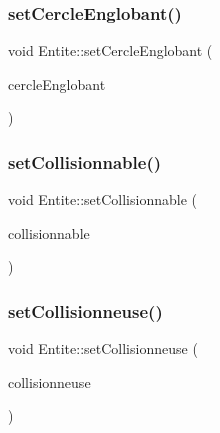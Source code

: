 \mbox{\label{class_entite_a88effd77e4276064031a02f5755cc321}} 
\subsubsection{\texorpdfstring{set\+Cercle\+Englobant()}{setCercleEnglobant()}}
{\footnotesize\ttfamily void Entite\+::set\+Cercle\+Englobant (\begin{DoxyParamCaption}\item[{const sf\+::\+Circle\+Shape \&}]{cercle\+Englobant }\end{DoxyParamCaption})\hspace{0.3cm}{\ttfamily [inline]}}

\mbox{\label{class_entite_acc07f9acea55b0a93b99f2ed57fef772}} 
\subsubsection{\texorpdfstring{set\+Collisionnable()}{setCollisionnable()}}
{\footnotesize\ttfamily void Entite\+::set\+Collisionnable (\begin{DoxyParamCaption}\item[{const bool \&}]{collisionnable }\end{DoxyParamCaption})\hspace{0.3cm}{\ttfamily [inline]}}

\mbox{\label{class_entite_afb20773e78fd021d737d9f69e347372f}} 
\subsubsection{\texorpdfstring{set\+Collisionneuse()}{setCollisionneuse()}}
{\footnotesize\ttfamily void Entite\+::set\+Collisionneuse (\begin{DoxyParamCaption}\item[{const bool \&}]{collisionneuse }\end{DoxyParamCaption})\hspace{0.3cm}{\ttfamily [inline]}}


